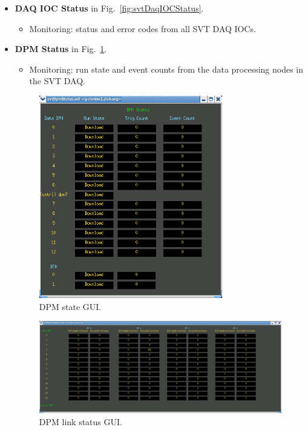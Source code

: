 \documentclass[12pt]{report}
\begin{document}
\begin{itemize}
\item \textbf{DAQ IOC Status} in Fig.~\ref{fig:svtDaqIOCStatus}.
\begin{itemize}
\item Monitoring: status and error codes from all SVT DAQ IOCs.
\end{itemize}

\item \textbf{DPM Status} in Fig.~\ref{fig:svtDpmStatus}.
\begin{itemize}
\item Monitoring: run state and event counts  from the data processing nodes in the SVT DAQ.
\end{itemize}

\begin{figure}[ht!]
\centering
\includegraphics[width=8cm]{svtDpmStatus.png}
\caption{DPM state GUI. \label{fig:svtDpmStatus}}
\end{figure}

\begin{figure}[hb!]
\centering
\includegraphics[width=13cm]{svtDpmLinkStatus.png}
\caption{DPM link status GUI. \label{fig:svtDpmLinkStatus}}
\end{figure}


\end{itemize}
\end{document}
